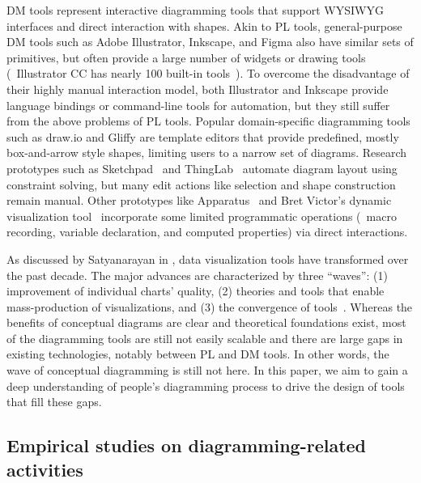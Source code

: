 DM tools represent interactive diagramming tools that support WYSIWYG interfaces and direct interaction with shapes. Akin to PL tools, general-purpose DM tools such as Adobe Illustrator, Inkscape, and Figma also have similar sets of primitives, but often provide a large number of widgets or drawing tools (\eg~Illustrator CC has nearly 100 built-in tools~). To overcome the disadvantage of their highly manual interaction model, both Illustrator and Inkscape provide language bindings or command-line tools for automation, but they still suffer from the above problems of PL tools. Popular domain-specific diagramming tools such as draw.io and Gliffy are template editors that provide predefined, mostly box-and-arrow style shapes, limiting users to a narrow set of diagrams. Research prototypes such as Sketchpad~\cite{sketchpad} and ThingLab~\cite{thinglab} automate diagram layout using constraint solving, but many edit actions like selection and shape construction remain manual. Other prototypes like Apparatus~ and Bret Victor's dynamic visualization tool~\cite{dynamicViz} incorporate some limited programmatic operations (\eg~macro recording, variable declaration, and computed properties) via direct interactions. 

As discussed by Satyanarayan \etal{} in \cite{reflectionsVis}, data visualization tools have transformed over the past decade. The major advances are characterized by three ``waves'': (1) improvement of individual charts' quality, (2) theories and tools that enable mass-production of visualizations, and (3) the convergence of tools~\cite{thirdWaveViz}. Whereas the benefits of conceptual diagrams are clear and theoretical foundations exist, most of the diagramming tools are still not easily scalable and there are large gaps in existing technologies, notably between PL and DM tools. In other words, the  wave of conceptual diagramming is still not here. In this paper, we aim to gain a deep understanding of people's diagramming process to drive the design of tools that fill these gaps.

\subsection{Empirical studies on diagramming-related activities}

